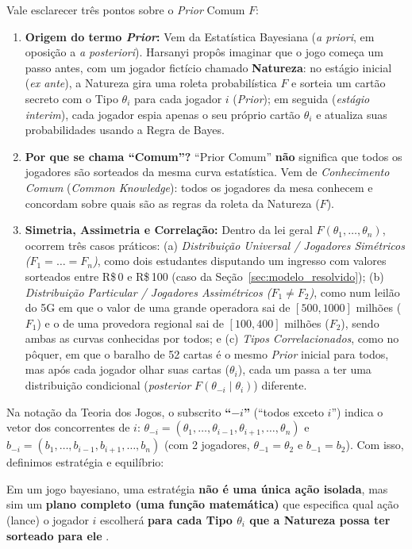 Vale esclarecer três pontos sobre o \textit{Prior} Comum $F$:
\begin{enumerate}[label=\arabic*.]
    \item \textbf{Origem do termo \textit{Prior}:} Vem da Estatística Bayesiana (\textit{a priori}, em oposição a \textit{a posteriori}). Harsanyi propôs imaginar que o jogo começa um passo antes, com um jogador fictício chamado \textbf{Natureza}: no estágio inicial (\textit{ex ante}), a Natureza gira uma roleta probabilística $F$ e sorteia um cartão secreto com o Tipo $\theta_i$ para cada jogador $i$ (\textit{Prior}); em seguida (\textit{estágio interim}), cada jogador espia apenas o seu próprio cartão $\theta_i$ e atualiza suas probabilidades usando a Regra de Bayes.
    \item \textbf{Por que se chama ``Comum''?} ``Prior Comum'' \textbf{não} significa que todos os jogadores são sorteados da mesma curva estatística. Vem de \textit{Conhecimento Comum} (\textit{Common Knowledge}): todos os jogadores da mesa conhecem e concordam sobre quais são as regras da roleta da Natureza ($F$).
    \item \textbf{Simetria, Assimetria e Correlação:} Dentro da lei geral $F(\theta_1, \dots, \theta_n)$, ocorrem três casos práticos: (a) \textit{Distribuição Universal / Jogadores Simétricos ($F_1 = \dots = F_n$)}, como dois estudantes disputando um ingresso com valores sorteados entre R\$\,0 e R\$\,100 (caso da Seção~\ref{sec:modelo_resolvido}); (b) \textit{Distribuição Particular / Jogadores Assimétricos ($F_1 \neq F_2$)}, como num leilão do 5G em que o valor de uma grande operadora sai de $[500, 1000]$ milhões ($F_1$) e o de uma provedora regional sai de $[100, 400]$ milhões ($F_2$), sendo ambas as curvas conhecidas por todos; e (c) \textit{Tipos Correlacionados}, como no pôquer, em que o baralho de 52 cartas é o mesmo \textit{Prior} inicial para todos, mas após cada jogador olhar suas cartas ($\theta_i$), cada um passa a ter uma distribuição condicional (\textit{posterior} $F(\theta_{-i} \mid \theta_i)$) diferente.
\end{enumerate}

Na notação da Teoria dos Jogos, o subscrito \textbf{``$-i$''} (``todos exceto $i$'') indica o vetor dos concorrentes de $i$: $\theta_{-i} = (\theta_1, \dots, \theta_{i-1}, \theta_{i+1}, \dots, \theta_n)$ e $b_{-i} = (b_1, \dots, b_{i-1}, b_{i+1}, \dots, b_n)$ (com 2 jogadores, $\theta_{-1} = \theta_2$ e $b_{-1} = b_2$). Com isso, definimos estratégia e equilíbrio:

\begin{definicao}
\label{def:estrategia_bayesiana}
Em um jogo bayesiano, uma estratégia \textbf{não é uma única ação isolada}, mas sim um \textbf{plano completo (uma função matemática)} que especifica qual ação (lance) o jogador $i$ escolherá \textbf{para cada Tipo $\theta_i$ que a Natureza possa ter sorteado para ele} \cite{gibbons1992}.
\end{definicao}


